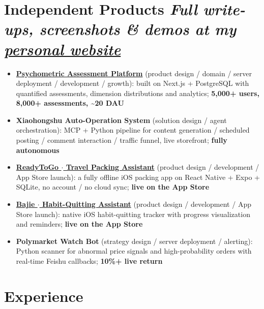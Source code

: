 \documentclass{resume}
\begin{document}
\section{Independent Products \hfill {\normalfont\small\textit{Full write-ups, screenshots \& demos at my \href{https://knowyourself.com.cn/intro_to_me/}{personal website}}}}

\begin{itemize}[parsep=0.6ex]
  \item \textbf{\href{https://knowyourself.com.cn}{Psychometric Assessment Platform}} (product design / domain / server deployment / development / growth): built on Next.js + PostgreSQL with quantified assessments, dimension distributions and analytics; \textbf{5,000+ users, 8,000+ assessments, \textasciitilde 20 DAU}
  \item \textbf{Xiaohongshu Auto-Operation System} (solution design / agent orchestration): MCP + Python pipeline for content generation / scheduled posting / comment interaction / traffic funnel, live storefront; \textbf{fully autonomous}
  \item \textbf{\href{https://apps.apple.com/us/app/id6762072006}{ReadyToGo $\cdot$ Travel Packing Assistant}} (product design / development / App Store launch): a fully offline iOS packing app on React Native + Expo + SQLite, no account / no cloud sync; \textbf{live on the App Store}
  \item \textbf{\href{https://apps.apple.com/us/app/id6757436622}{Bajie $\cdot$ Habit-Quitting Assistant}} (product design / development / App Store launch): native iOS habit-quitting tracker with progress visualization and reminders; \textbf{live on the App Store}
  \item \textbf{Polymarket Watch Bot} (strategy design / server deployment / alerting): Python scanner for abnormal price signals and high-probability orders with real-time Feishu callbacks; \textbf{10\%+ live return}
\end{itemize}

\section{Experience}
\end{document}
